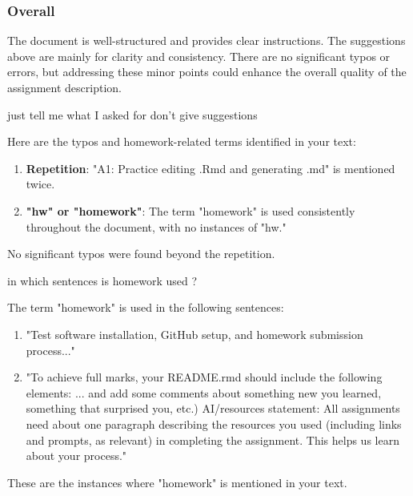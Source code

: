 \begin{botresponse}
\subsubsection{Overall}

The document is well-structured and provides clear instructions. The suggestions above are mainly for clarity and consistency. There are no significant typos or errors, but addressing these minor points could enhance the overall quality of the assignment description.

\end{botresponse}

\begin{userprompt}

just tell me what I asked for don't give suggestions

\end{userprompt}

\begin{botresponse}

Here are the typos and homework-related terms identified in your text:

\begin{enumerate}
\item \textbf{Repetition}: "A1: Practice editing .Rmd and generating .md" is mentioned twice.
\item \textbf{"hw" or "homework"}: The term "homework" is used consistently throughout the document, with no instances of "hw."
\end{enumerate}

No significant typos were found beyond the repetition.

\end{botresponse}

\begin{userprompt}

in which sentences is homework used ?

\end{userprompt}

\begin{botresponse}

The term "homework" is used in the following sentences:

\begin{enumerate}
\item "Test software installation, GitHub setup, and homework submission process..."
\item "To achieve full marks, your README.rmd should include the following elements: ... and add some comments about something new you learned, something that surprised you, etc.) AI/resources statement: All assignments need about one paragraph describing the resources you used (including links and prompts, as relevant) in completing the assignment. This helps us learn about your process."
\end{enumerate}

These are the instances where "homework" is mentioned in your text.

\end{botresponse}

